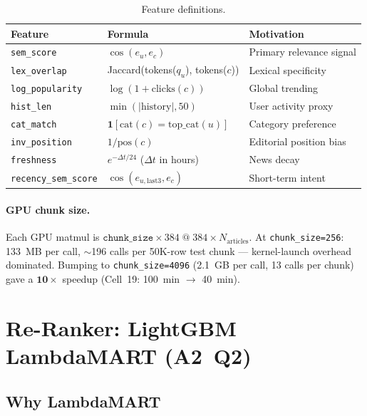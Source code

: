\documentclass[11pt,a4paper]{article}
\newcommand{\feature}[1]{\texttt{#1}}
\begin{document}
\begin{table}[h]
\centering
\caption{Feature definitions.}
\label{tab:features}
\begin{tabular}{p{3.5cm}p{4.5cm}p{4.5cm}}
\toprule
Feature & Formula & Motivation \\
\midrule
\feature{sem\_score}         & $\cos(e_u, e_c)$                              & Primary relevance signal \\
\feature{lex\_overlap}       & Jaccard(tokens($q_u$), tokens($c$))            & Lexical specificity \\
\feature{log\_popularity}    & $\log(1 + \text{clicks}(c))$                  & Global trending \\
\feature{hist\_len}          & $\min(|\text{history}|, 50)$                   & User activity proxy \\
\feature{cat\_match}         & $\mathbf{1}[\text{cat}(c)=\text{top\_cat}(u)]$ & Category preference \\
\feature{inv\_position}      & $1/\text{pos}(c)$                              & Editorial position bias \\
\feature{freshness}          & $e^{-\Delta t/24}$ ($\Delta t$ in hours)       & News decay \\
\feature{recency\_sem\_score}& $\cos(e_{u,\text{last3}}, e_c)$               & Short-term intent \\
\bottomrule
\end{tabular}
\end{table}

\paragraph{GPU chunk size.} Each GPU matmul is
$\texttt{chunk\_size} \times 384 \;\mathbf{@}\; 384 \times N_{\text{articles}}$.
At \texttt{chunk\_size=256}: 133~MB per call, $\sim$196 calls per 50K-row test
chunk --- kernel-launch overhead dominated. Bumping to \texttt{chunk\_size=4096}
(2.1~GB per call, 13 calls per chunk) gave a $\mathbf{10\times}$ speedup
(Cell~19: 100~min $\to$ 40~min).

\section{Re-Ranker: LightGBM LambdaMART (A2~Q2)}

\subsection{Why LambdaMART}
\end{document}
